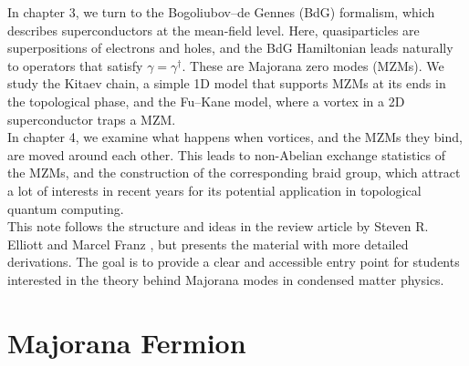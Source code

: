 \documentclass[11pt, oneside]{book}
\theoremstyle{break}
\theoremstyle{break}
\begin{document}
In chapter 3, we turn to the Bogoliubov–de Gennes (BdG) formalism, which describes superconductors at the mean-field level. Here, quasiparticles are superpositions of electrons and holes, and the BdG Hamiltonian leads naturally to operators that satisfy $\gamma = \gamma^\dagger$. These are Majorana zero modes (MZMs). We study the Kitaev chain, a simple 1D model that supports MZMs at its ends in the topological phase, and the Fu–Kane model, where a vortex in a 2D superconductor traps a MZM.\\

In chapter 4, we examine what happens when vortices, and the MZMs they bind, are moved around each other. This leads to non-Abelian exchange statistics of the MZMs, and the construction of the corresponding braid group, which attract a lot of interests in recent years for its potential application in topological quantum computing.\\

This note follows the structure and ideas in the review article by Steven R. Elliott and Marcel Franz \cite{Review}, but presents the material with more detailed derivations. The goal is to provide a clear and accessible entry point for students interested in the theory behind Majorana modes in condensed matter physics.

\chapter{Majorana Fermion}
\end{document}
